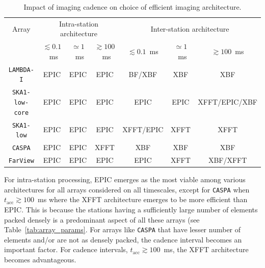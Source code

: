 \documentclass[
  journal=pasa,
  manuscript=article-type,
  year=2020,
  volume=37,
]{cup-journal}
\begin{document}
\begin{table}[htb!]
\normalsize
\begin{threeparttable}
\caption{Impact of imaging cadence on choice of efficient imaging architecture.}
\label{tab:cadence}
\begin{tabular}{c|ccc|ccc}
\toprule
\headrow 
Array & \multicolumn{3}{c|}{Intra-station architecture} & \multicolumn{3}{c}{Inter-station architecture} \\ 
 & $\lesssim 0.1$~ms & $\simeq 1$~ms & $\gtrsim 100$~ms & $\lesssim 0.1$~ms & $\simeq 1$~ms & $\gtrsim 100$~ms \\ 
\midrule\midrule

\texttt{LAMBDA-I} & EPIC & EPIC & EPIC & BF/XBF & XBF & XBF \\
\midrule
\texttt{SKA1-low-core} & EPIC & EPIC & EPIC & EPIC & EPIC & XFFT/EPIC/XBF \\
\midrule
\texttt{SKA1-low} & EPIC & EPIC & EPIC & XFFT/EPIC & XFFT & XFFT \\
\midrule
\texttt{CASPA} & EPIC & EPIC & XFFT & XBF & XBF & XBF \\
\midrule
\texttt{FarView} & EPIC & EPIC & EPIC & EPIC & XFFT & XBF/XFFT \\
\bottomrule
\end{tabular}
\end{threeparttable}
\end{table}

For intra-station processing, EPIC emerges as the most viable among various architectures for all arrays considered on all timescales, except for \texttt{CASPA} when $t_\textrm{acc}\gtrsim 100$~ms where the XFFT architecture emerges to be more efficient than EPIC. This is because the stations having a sufficiently large number of elements packed densely is a predominant aspect of all these arrays (see Table~\ref{tab:array_params}. For arrays like \texttt{CASPA} that have lesser number of elements and/or are not as densely packed, the cadence interval becomes an important factor. For cadence intervals, $t_\textrm{acc}\gtrsim 100$~ms, the XFFT architecture becomes advantageous.
\end{document}
